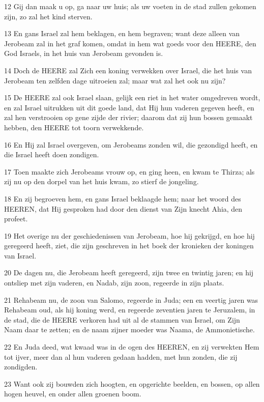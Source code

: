 \par 12 Gij dan maak u op, ga naar uw huis; als uw voeten in de stad zullen gekomen zijn, zo zal het kind sterven.
\par 13 En gans Israel zal hem beklagen, en hem begraven; want deze alleen van Jerobeam zal in het graf komen, omdat in hem wat goeds voor den HEERE, den God Israels, in het huis van Jerobeam gevonden is.
\par 14 Doch de HEERE zal Zich een koning verwekken over Israel, die het huis van Jerobeam ten zelfden dage uitroeien zal; maar wat zal het ook nu zijn?
\par 15 De HEERE zal ook Israel slaan, gelijk een riet in het water omgedreven wordt, en zal Israel uitrukken uit dit goede land, dat Hij hun vaderen gegeven heeft, en zal hen verstrooien op gene zijde der rivier; daarom dat zij hun bossen gemaakt hebben, den HEERE tot toorn verwekkende.
\par 16 En Hij zal Israel overgeven, om Jerobeams zonden wil, die gezondigd heeft, en die Israel heeft doen zondigen.
\par 17 Toen maakte zich Jerobeams vrouw op, en ging heen, en kwam te Thirza; als zij nu op den dorpel van het huis kwam, zo stierf de jongeling.
\par 18 En zij begroeven hem, en gans Israel beklaagde hem; naar het woord des HEEREN, dat Hij gesproken had door den dienst van Zijn knecht Ahia, den profeet.
\par 19 Het overige nu der geschiedenissen van Jerobeam, hoe hij gekrijgd, en hoe hij geregeerd heeft, ziet, die zijn geschreven in het boek der kronieken der koningen van Israel.
\par 20 De dagen nu, die Jerobeam heeft geregeerd, zijn twee en twintig jaren; en hij ontsliep met zijn vaderen, en Nadab, zijn zoon, regeerde in zijn plaats.
\par 21 Rehabeam nu, de zoon van Salomo, regeerde in Juda; een en veertig jaren was Rehabeam oud, als hij koning werd, en regeerde zeventien jaren te Jeruzalem, in de stad, die de HEERE verkoren had uit al de stammen van Israel, om Zijn Naam daar te zetten; en de naam zijner moeder was Naama, de Ammonietische.
\par 22 En Juda deed, wat kwaad was in de ogen des HEEREN, en zij verwekten Hem tot ijver, meer dan al hun vaderen gedaan hadden, met hun zonden, die zij zondigden.
\par 23 Want ook zij bouwden zich hoogten, en opgerichte beelden, en bossen, op allen hogen heuvel, en onder allen groenen boom.
